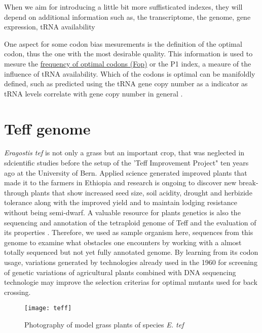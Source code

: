 When we aim for introducing a little bit more suffisticated indexes, they will depend on additional information such as, the transcriptome, the genome, gene expression, tRNA availability

One aspect for some codon bias mesurements is the definition of the optimal codon, thus the one with the most desirable quality. This information is used to mesure the \hyperlink{function:Fop}{frequency of optimal codons (Fop)} or the P1 index, a meaure of the influence of tRNA availability. Which of the codons is optimal can be manifoldly defined, such as predicted using the tRNA gene copy number as a indicator as tRNA levels correlate with gene copy number in general \cite{Chaney2015}. %

\section{Teff genome}
\textit{Eragostis tef} is not only a grass but an important crop, that was neglected in sdcientific studies before the setup of the 'Teff Improvement Project" ten years ago at the University of Bern. Applied science generated improved plants that made it to the farmers in Ethiopia and research is ongoing to discover new break-through plants that show increased seed size, soil acidity, drought and herbizide tolerance along with the improved yield and to maintain lodging resistance without being semi-dwarf. A valuable resource for plants genetics is also the sequencing and annotation of the tetraploid genome of Teff and the evaluation of its properties \cite{cannarozzi2014genome}. Therefore, we used as sample organism here, sequences from this genome to examine what obstacles one encounters by working with a almost totally sequenced but not yet fully annotated genome. By learning from its codon usage, variations generated by technologies already used in the 1960 for screening of genetic variations of agricultural plants combined with DNA sequencing technologie may improve the selection criterias for optimal mutants used for back crossing. 

\begin{figure}[tb] 
\centering 
\texttt{[image: teff]} 
\caption[\textit{Eragostis tef} growing in culture room]{Photography of model grass plants of species \textit{E. tef}}
\label{fig:teff} 
\end{figure}


